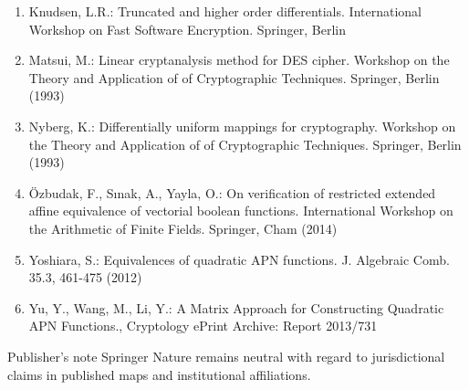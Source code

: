 \documentclass[10pt]{article}
\begin{document}
\begin{enumerate}
  \item Knudsen, L.R.: Truncated and higher order differentials. International Workshop on Fast Software Encryption. Springer, Berlin
  \item Matsui, M.: Linear cryptanalysis method for DES cipher. Workshop on the Theory and Application of of Cryptographic Techniques. Springer, Berlin (1993)
  \item Nyberg, K.: Differentially uniform mappings for cryptography. Workshop on the Theory and Application of of Cryptographic Techniques. Springer, Berlin (1993)
  \item Özbudak, F., Sınak, A., Yayla, O.: On verification of restricted extended affine equivalence of vectorial boolean functions. International Workshop on the Arithmetic of Finite Fields. Springer, Cham (2014)
  \item Yoshiara, S.: Equivalences of quadratic APN functions. J. Algebraic Comb. 35.3, 461-475 (2012)
  \item Yu, Y., Wang, M., Li, Y.: A Matrix Approach for Constructing Quadratic APN Functions., Cryptology ePrint Archive: Report 2013/731
\end{enumerate}

Publisher's note Springer Nature remains neutral with regard to jurisdictional claims in published maps and institutional affiliations.
\end{document}
